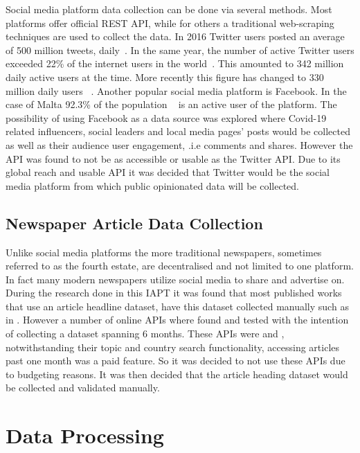 Social media platform data collection can be done via several methods.
Most platforms offer official \ac{REST} \ac{API}, while for others a traditional web-scraping techniques are used to collect the data.
In 2016 Twitter users posted an average of 500 million tweets, daily~\citep{Crannell2016}.
In the same year, the number of active Twitter users exceeded 22\% of the internet users in the world~\citep{Kayser2016}.
This amounted to 342 million daily active users at the time.
More recently this figure has changed to 330 million daily users ~\citep{tankovska_2021}.
Another popular social media platform is Facebook.
In the case of Malta 92.3\% of the population ~\citep{napoleoncat} is an active user of the platform.
The possibility of using Facebook as a data source was explored where Covid-19 related influencers, social leaders and local media pages' posts would be collected as well as their audience user engagement, .i.e comments and shares.
However the \ac{API} was found to not be as accessible or usable as the Twitter \ac{API}.
Due to its global reach and usable \ac{API} it was decided that Twitter would be the social media platform from which public opinionated data will be collected.

\subsection{Newspaper Article Data Collection}

Unlike social media platforms the more traditional newspapers, sometimes referred to as the fourth estate, are decentralised and not limited to one platform.
In fact many modern newspapers utilize social media to share and advertise on.
During the research done in this \ac{IAPT} it was found that most published works that use an article headline dataset, have this dataset collected manually such as in \citet{newspaper_headlines}.
However a number of online \ac{API}s where found and tested with the intention of collecting a dataset spanning 6 months.
These \ac{API}s were \citet{newsapi} and \citet{newscatcher}, notwithstanding their topic and country search functionality, accessing articles past one month was a paid feature.
So it was decided to not use these \ac{API}s due to budgeting reasons.
It was then decided that the article heading dataset would be collected and validated manually.


\section{Data Processing}
\blindtext
